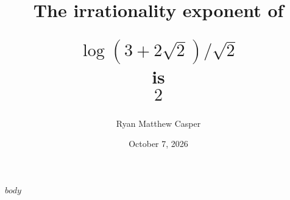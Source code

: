 \documentclass[11pt]{article}
\title{The irrationality exponent of\par $$\log(3+2\sqrt{2})/\sqrt{2}$$ is $$2$$}
\author{Ryan Matthew Casper}
\date{October 7, 2026}
\begin{document}
\maketitle
$body$
\end{document}
